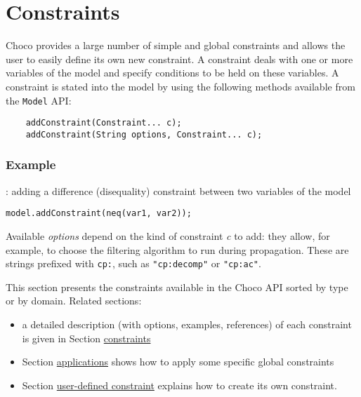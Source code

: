 \section{Constraints}\label{model:constraints}\hypertarget{model:constraints}{}
Choco provides a large number of simple and global constraints and allows the user to easily define its own new constraint.
A constraint deals with one or more variables of the model and specify conditions to be held on these variables. 
A constraint is stated into the model by using the following methods available from the \texttt{Model} API: 
\begin{lstlisting}
	addConstraint(Constraint... c);
	addConstraint(String options, Constraint... c);
\end{lstlisting} 
\subsubsection{Example}: adding a difference (disequality) constraint between two variables of the model
\begin{lstlisting}
model.addConstraint(neq(var1, var2));
\end{lstlisting}
Available \emph{options} depend on the kind of constraint \emph{c} to add: they allow, for example, to choose the filtering algorithm to run during propagation. These are strings prefixed with \texttt{cp:}, such as \texttt{"cp:decomp"} or \texttt{"cp:ac"}.

This section presents the constraints available in the Choco API sorted by type or by domain. Related sections:
\begin{itemize}
\item a detailed description (with options, examples, references) of each constraint is given in Section \hyperlink{ch:constraints}{constraints}
\item Section \hyperlink{doc:applications}{applications} shows how to apply some specific global constraints
\item Section \hyperlink{advanced:defineyourownconstraint}{user-defined constraint} explains how to create its own constraint.
\end{itemize}



